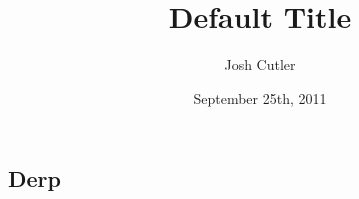 \documentclass[12pt]{article}
\title{Default Title}
\author{Josh Cutler}
\date{September 25th, 2011}
\begin{document}
\maketitle

\subsection*{
	Derp
}
\end{document}
